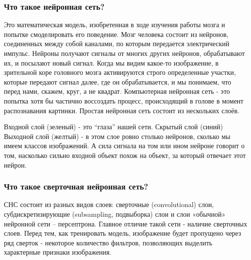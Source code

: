 \subsubsection*{Что такое нейронная сеть?}
Это математическая модель, изобретенная в ходе изучения работы мозга и попытке смоделировать его поведение. 
Мозг человека состоит из нейронов, соединенных между собой каналами, по которым передается электрический импульс. Нейроны получают сигналы от многих других нейронов, обрабатывают их, и посылают новый сигнал. 
Когда мы видим какое-то изображение, в зрительной коре головного мозга активируются строго определенные участки, которые передают сигнал далее, где он обрабатывается, и мы понимаем, что перед нами, скажем, круг, а не квадрат.
Компьютерная нейронная сеть - это попытка хотя бы частично воссоздать процесс, происходящий в голове в момент распознавания картинки.  Простая нейронная сеть состоит из нескольких слоёв. 
\begin{figure}[H]
\end{figure}

Входной слой (зеленый) - это “глаза” нашей сети.
 Скрытый слой (синий)
Выходной слой (желтый) - в этом слое ровно столько нейронов, сколько мы имеем классов изображений. А сила сигнала на том или ином нейроне говорит о том, насколько сильно входной объект похож на объект, за который отвечает этот нейрон.
\subsubsection*{Что такое сверточная нейронная сеть?}
СНС состоит из разных видов слоев: сверточные (convolutional) слои, субдискретизирующие (subsampling, подвыборка) слои и слои «обычной» нейронной сети – персептрона.
Главное отличие такой сети - наличие сверточных слоев. Перед тем, как тренировать модель, изображение будет пропущено через ряд сверток - некоторое количество фильтров, позволяющих выделить характерные признаки изображения.
